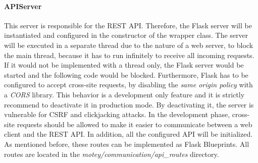 \paragraph{APIServer} This server is responsible for the \ac{REST} \ac{API}.
Therefore, the Flask server will be instantiated and configured in the constructor of the wrapper class.
The server will be executed in a separate thread due to the nature of a web server, to block the main thread, because it has to run infinitely to receive all incoming requests.
If it would not be implemented with a thread only, the Flask server would be started and the following code would be blocked.
Furthermore, Flask has to be configured to accept cross-site requests, by disabling the \textit{same origin policy} with a \textit{\ac{CORS}} library.
This behavior is a development only feature and it is strictly recommend to deactivate it in production mode.
By deactivating it, the server is vulnerable for \ac{CSRF} and clickjacking attacks.
In the development phase, cross-site requests should be allowed to make it easier to communicate between a web client and the \ac{REST} \ac{API}.
In addition, all the configured \ac{API} will be initialized.
As mentioned before, these routes can be implemented as Flask Blueprints.
All routes are located in the \textit{motey/communication/api\_routes} directory.\newline

